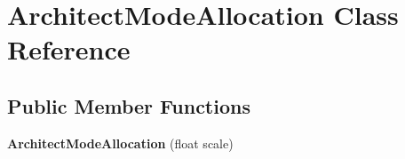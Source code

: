 \hypertarget{classArchitectModeAllocation}{\section{Architect\-Mode\-Allocation Class Reference}
\label{classArchitectModeAllocation}
}
\subsection*{Public Member Functions}
\begin{DoxyCompactItemize}
\item 
\hypertarget{classArchitectModeAllocation_a44bf2b598a53d5f5039f28396123feb6}{{\bfseries Architect\-Mode\-Allocation} (float scale)}\label{classArchitectModeAllocation_a44bf2b598a53d5f5039f28396123feb6}

\end{DoxyCompactItemize}
